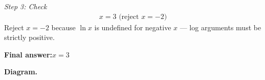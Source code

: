 \documentclass[11pt]{article}
\begin{document}
\textit{Step 3: Check}
\[\begin{gathered}
x = 3 \text{ (reject } x = -2\text{)}
\end{gathered}\]
Reject \( x = -2 \) because \( \ln x \) is undefined for negative \( x \) --- log arguments must be strictly positive.

\begin{answerbox}
\textbf{Final answer:}\quad \(\displaystyle x = 3\)
\end{answerbox}
\textbf{Diagram.}

\begin{center}
\end{center}
\end{document}
